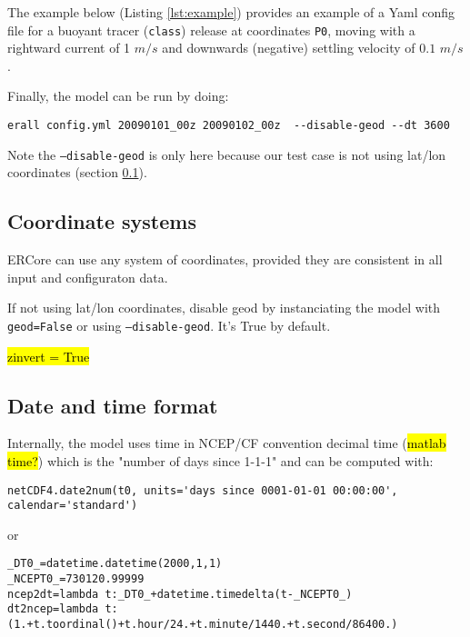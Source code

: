 \documentclass[a4paper]{article}
\begin{document}
The example below (Listing \ref{lst:example}) provides an example of a Yaml config file for a buoyant tracer (\texttt{class}) release at coordinates \texttt{P0}, moving with a rightward current of 1 $m/s$ and downwards (negative) settling velocity of $0.1$ $m/s$.



Finally, the model can be run by doing: 

\begin{Verbatim}[fontsize=\small]
erall config.yml 20090101_00z 20090102_00z  --disable-geod --dt 3600
\end{Verbatim}

Note the \texttt{--disable-geod} is only here because our test case is not using lat/lon coordinates (section \ref{ssec:coords}).

\subsection{Coordinate systems}
\label{ssec:coords}

ERCore can use any system of coordinates, provided they are consistent in all input and configuraton data. 

If not using lat/lon coordinates, disable geod by instanciating the model with \texttt{geod=False} or using \texttt{--disable-geod}. It's True by default.

\hl{zinvert = True}

\subsection{Date and time format}
\label{ssec:datetime}

Internally, the model uses time in NCEP/CF convention decimal time (\hl{matlab time?}) which is the "number of days since 1-1-1"  and can be computed with:


\begin{Verbatim}[fontsize=\small]
netCDF4.date2num(t0, units='days since 0001-01-01 00:00:00', calendar='standard') 
\end{Verbatim}

or 

\begin{Verbatim}[fontsize=\small]
_DT0_=datetime.datetime(2000,1,1)
_NCEPT0_=730120.99999
ncep2dt=lambda t:_DT0_+datetime.timedelta(t-_NCEPT0_)
dt2ncep=lambda t: (1.+t.toordinal()+t.hour/24.+t.minute/1440.+t.second/86400.)
\end{Verbatim}
\end{document}
